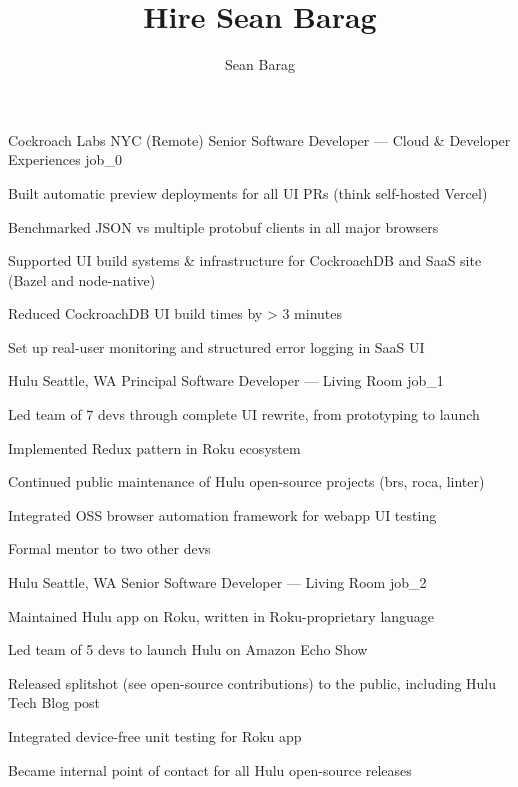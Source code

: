 \documentclass[10pt]{barag_resume}
\title{Hire Sean Barag}
\author{Sean Barag}
\begin{document}
\relax
    \renewcommand{\labelitemi}{$\cdot$}\relax %
    \begin{job}{Cockroach Labs}
        {NYC (Remote)}
        {Senior Software Developer --- Cloud \& Developer Experiences}
        {job_0}
            \begin{itemize*}
                \item Built automatic preview deployments for all UI PRs (think self-hosted Vercel)
                \item Benchmarked JSON vs multiple protobuf clients in all major browsers
                \item Supported UI build systems \& infrastructure for CockroachDB and SaaS site (Bazel and node-native)
                \item Reduced CockroachDB UI build times by > 3 minutes
                \item Set up real-user monitoring and structured error logging in SaaS UI
            \end{itemize*}
    \end{job}

    \begin{job}{Hulu}
        {Seattle, WA}
        {Principal Software Developer --- Living Room}
        {job_1}
            \begin{itemize*}
                \item Led team of 7 devs through complete UI rewrite, from prototyping to launch
                \item Implemented Redux pattern in Roku ecosystem
                \item Continued public maintenance of Hulu open-source projects (brs, roca, linter)
                \item Integrated OSS browser automation framework for webapp UI testing
                \item Formal mentor to two other devs
            \end{itemize*}
    \end{job}

    \begin{job}{Hulu}
        {Seattle, WA}
        {Senior Software Developer --- Living Room}
        {job_2}
            \begin{itemize*}
                \item Maintained Hulu app on Roku, written in Roku-proprietary language
                \item Led team of 5 devs to launch Hulu on Amazon Echo Show
                \item Released splitshot (see open-source contributions) to the public, including Hulu Tech Blog post
                \item Integrated device-free unit testing for Roku app
                \item Became internal point of contact for all Hulu open-source releases
            \end{itemize*}
    \end{job}
\end{document}
